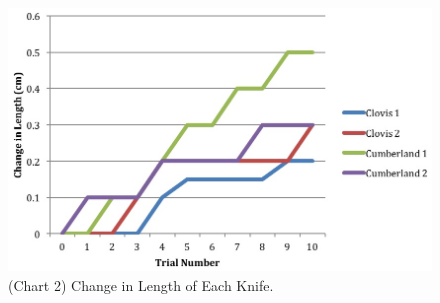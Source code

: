 
\begin{figure}[!p]
	\includegraphics[width=\linewidth]{figures/gagglioli_Chart2}
	\centering
	\caption{(Chart 2) Change in Length of Each Knife.}
	\label{fig:Chart2}
\end{figure}

